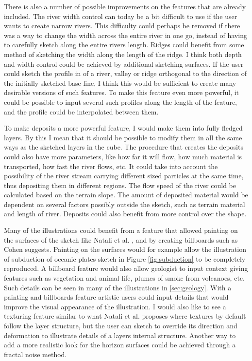 \documentclass[a4paper,12pt]{report}
\newcommand{\secref}[1]{\autoref{#1}}
\begin{document}
There is also a number of possible improvements on the features that are already included. The river width control can today be a bit difficult to use if the user wants to create narrow rivers. This difficulty could perhaps be removed if there was a way to change the width across the entire river in one go, instead of having to carefully sketch along the entire rivers length. Ridges could benefit from some method of sketching the width along the length of the ridge. I think both depth and width control could be achieved by additional sketching surfaces. If the user could sketch the profile in of a river, valley or ridge orthogonal to the direction of the initially sketched base line, I think this would be sufficient to create many desirable versions of such features. To make this feature even more powerful, it could be possible to input several such profiles along the length of the feature, and the profile could be interpolated between them.

To make deposits a more powerful feature, I would make them into fully fledged layers. By this I mean that it should be possible to modify them in all the same ways as the sketched layers in the cube. The procedure that creates the deposits could also have more parameters, like how far it will flow, how much material is transported, how fast the river flows, etc. It could take into account the possibility of the river stream carrying different sized particles at the same time, thus depositing them in different regions. The flow speed of the river could be calculated based on the terrain slope. The amount of deposited material would be dependent on several factors possibly outside the sketch, such as terrain material and length of river. Deposits could also benefit from more control over the shape.

Many of the illustrations could benefit from a feature that allowed painting on the surfaces of the sketch like Natali et al. \cite{natalirapid}, and by creating billboards such as Cohen \cite{cohen2000harold} suggests. Painting on the surfaces would for example allow the illustration of subduction of oceanic plates sketch in Figure \ref{fig:subduction} to be completely reproduced. A billboard feature would also allow geologist to input context giving features such as vegetation and animal life, plumes of smoke from volcanoes, etc. Such details can be seen in many of the illustrations in \secref{sec:geology}. With a painting and billboards feature artistic users could input details that would improve the visual appearance of the illustration. I would also like to see a texturing feature similar to what Natali et al. proposes where textures by default follow the layer structure, but the user can sketch to override its direction and deformation to illustrate details of a layers internal structure. Another way to add a more realistic look for the horizon surfaces could be achieved through a fractal noise method.
\end{document}
